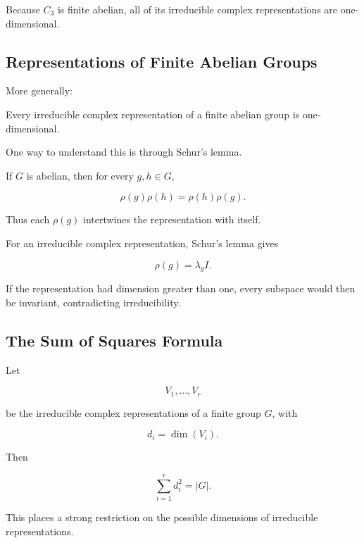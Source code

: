 Because \(C_3\) is finite abelian, all of its irreducible complex
representations are one-dimensional.

\subsection{Representations of Finite Abelian Groups}
\label{subsec:finite-abelian-representations}

More generally:

\begin{theorem}
Every irreducible complex representation of a finite abelian group is
one-dimensional.
\end{theorem}

One way to understand this is through Schur's lemma.

If \(G\) is abelian, then for every \(g,h\in G\),

\[ \rho(g)\rho(h)=\rho(h)\rho(g). \]

Thus each \(\rho(g)\) intertwines the representation with itself.

For an irreducible complex representation, Schur's lemma gives

\[ \rho(g)=\lambda_gI. \]

If the representation had dimension greater than one, every subspace would
then be invariant, contradicting irreducibility.

\subsection{The Sum of Squares Formula}
\label{subsec:sum-squares-dimensions}

Let

\[ V_1,\ldots,V_r \]

be the irreducible complex representations of a finite group \(G\), with

\[ d_i=\dim(V_i). \]

Then

\begin{theorem}
\[ \boxed{\sum_{i=1}^{r}d_i^2=|G|.} \]
\end{theorem}

This places a strong restriction on the possible dimensions of irreducible
representations.

